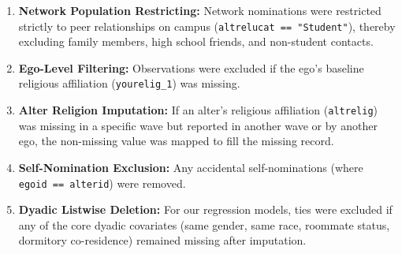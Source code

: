 \documentclass[
  letterpaper,
  DIV=11,
  numbers=noendperiod]{scrartcl}
\providecommand{\tightlist}{%
  \setlength{\itemsep}{0pt}\setlength{\parskip}{0pt}}
\begin{document}
\begin{enumerate}
\def\labelenumi{\arabic{enumi}.}
\tightlist
\item
  \textbf{Network Population Restricting:} Network nominations were
  restricted strictly to peer relationships on campus
  (\texttt{altrelucat\ ==\ "Student"}), thereby excluding family
  members, high school friends, and non-student contacts.
\item
  \textbf{Ego-Level Filtering:} Observations were excluded if the ego's
  baseline religious affiliation (\texttt{yourelig\_1}) was missing.
\item
  \textbf{Alter Religion Imputation:} If an alter's religious
  affiliation (\texttt{altrelig}) was missing in a specific wave but
  reported in another wave or by another ego, the non-missing value was
  mapped to fill the missing record.
\item
  \textbf{Self-Nomination Exclusion:} Any accidental self-nominations
  (where \texttt{egoid\ ==\ alterid}) were removed.
\item
  \textbf{Dyadic Listwise Deletion:} For our regression models, ties
  were excluded if any of the core dyadic covariates (same gender, same
  race, roommate status, dormitory co-residence) remained missing after
  imputation.
\end{enumerate}
\end{document}
